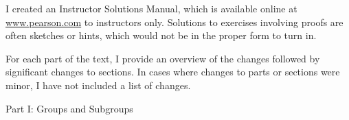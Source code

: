 \documentclass[11pt,oneside]{article}
\begin{document}
\begin{BookBody}
I created an Instructor Solutions Manual, which is available online at \url{www.pearson.com} to instructors only. Solutions to exercises involving proofs are often sketches or hints, which would not be in the proper form to turn in.


\noindent For each part of the text, I provide an overview of the changes followed by significant changes to sections. In cases where changes to parts or sections were minor, I have not included a list of changes.

\noindent Part I: Groups and Subgroups


\end{BookBody}

\BookNarrativetrue
\end{document}
